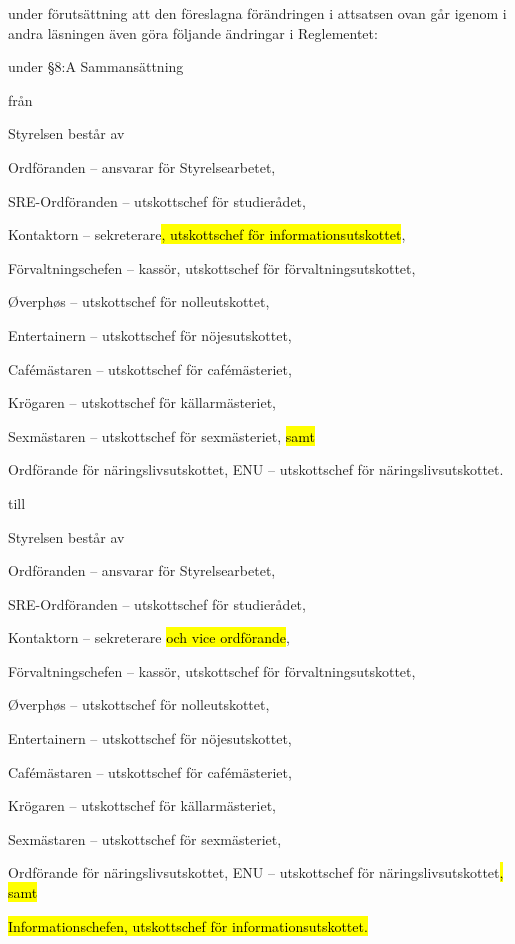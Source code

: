 \documentclass[../_main/handlingar.tex]{subfiles}
\begin{document}
\begin{attsatser}
    \changenote
    \newpage        

    \att under förutsättning att den föreslagna förändringen i attsatsen ovan går igenom i andra läsningen även göra följande ändringar i Reglementet:
    
    
    \begin{description}[font=$\bullet$~\normalfont\scshape\color{black!50!black}]
    \item under §8:A Sammansättning
   

    från

    Styrelsen består av
    \begin{alphlist}
    \item Ordföranden -- ansvarar för Styrelsearbetet,
    \item SRE-Ordföranden -- utskottschef för studierådet,
    \item Kontaktorn -- sekreterare\hl{, utskottschef för informationsutskottet},
    \item Förvaltningschefen -- kassör, utskottschef för förvaltningsutskottet,
    \item Øverphøs -- utskottschef för nolleutskottet,
    \item Entertainern -- utskottschef för nöjesutskottet,
    \item Cafémästaren -- utskottschef för cafémästeriet,
    \item Krögaren -- utskottschef för källarmästeriet,
    \item Sexmästaren -- utskottschef för sexmästeriet, \hl{samt}
    \item Ordförande för näringslivsutskottet, ENU
        -- utskottschef för näringslivsutskottet.
    \end{alphlist}

    till

    Styrelsen består av
    \begin{alphlist}
    \item Ordföranden -- ansvarar för Styrelsearbetet,
    \item SRE-Ordföranden -- utskottschef för studierådet,
    \item Kontaktorn -- sekreterare \hl{och vice ordförande},
    \item Förvaltningschefen -- kassör, utskottschef för förvaltningsutskottet,
    \item Øverphøs -- utskottschef för nolleutskottet,
    \item Entertainern -- utskottschef för nöjesutskottet,
    \item Cafémästaren -- utskottschef för cafémästeriet,
    \item Krögaren -- utskottschef för källarmästeriet,
    \item Sexmästaren -- utskottschef för sexmästeriet, 
    \item Ordförande för näringslivsutskottet, ENU -- utskottschef för näringslivsutskottet\hl{, samt}
    \item \hl{Informationschefen, utskottschef för informationsutskottet.}
    \end{alphlist}


\end{description}
\end{attsatser}
\end{document}

